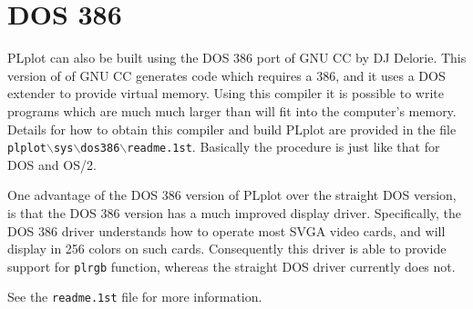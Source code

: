 \section{DOS 386}

PLplot can also be built using the 
DOS 386 port of GNU CC by DJ Delorie.  This version of of GNU CC 
generates code which requires a 386, and it uses a DOS extender to 
provide virtual memory.  Using this compiler it is possible to write
programs which are much much larger than will fit into the computer's
memory.  Details for how to obtain this compiler and build PLplot
are provided in the file
{\tt plplot$\backslash$sys$\backslash$dos386$\backslash$readme.1st}.
Basically the procedure is just like that for DOS and OS/2.

One advantage of the DOS 386 version of PLplot over the straight DOS version,
is that the DOS 386 version has a much improved display driver.  Specifically,
the DOS 386 driver understands how to operate most SVGA video cards, and
will display in 256 colors on such cards.  Consequently this driver is
able to provide support for {\tt plrgb} function, whereas the straight DOS
driver currently does not.

See the {\tt readme.1st} file for more information.
